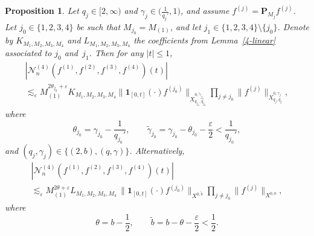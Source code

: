 \documentclass[11pt,reqno,english]{amsart}
\numberwithin{equation}{section}
\theoremstyle{plain}
\newtheorem{proposition}[theorem]{Proposition}
\theoremstyle{definition}
\theoremstyle{remark}
\begin{document}
\begin{proposition}\label{4linear'}
	Let $q_j\in[2,\infty)$ and $\gamma_j\in\big(\frac{1}{q_j'},1\big)$, and assume $f^{(j)}=\mathbf{P}_{M_j}f^{(j)}$. Let $j_0\in\{1,2,3,4\}$ be such that $M_{j_0}=M_{(1)}$, and let $j_1\in\{1,2,3,4\}\setminus\{j_0\}$. Denote by $K_{M_1,M_2,M_3,M_4}$ and $L_{M_1,M_2,M_3,M_4}$ the coefficients from Lemma~\ref{4-linear} associated to $j_0$ and~$j_1$. Then for any $|t|\leq 1$,
	\begin{multline}\label{quintic:type1}
		|\mathcal{N}_n^{(4)}(f^{(1)},f^{(2)},f^{(3)},f^{(4)})(t)|
		\\
		\lesssim_{\varepsilon}
		M_{(1)}^{2\theta_{j_0}+\varepsilon}
		K_{M_1,M_2,M_3,M_4}
		\|\mathbf{1}_{[0,t]}(\cdot)f^{(j_0)}\|_{X_{q_{j_0},q_{j_0}}^{0,\widetilde{\gamma}_{j_0}}}
		\prod_{j\neq j_0}\|f^{(j)}\|_{X_{q_j,q_j}^{0,\gamma_j}},
	\end{multline}
	where
	\[
	\theta_{j_0}=\gamma_{j_0}-\frac{1}{q_{j_0}'},
	\qquad
	\widetilde{\gamma}_{j_0}=\gamma_{j_0}-\theta_{j_0}-\frac{\varepsilon}{2}<\frac{1}{q_{j_0}'},
	\]
	and $(q_j,\gamma_j)\in\{(2,b),(q,\gamma)\}$. Alternatively,
	\begin{multline}\label{quintic:type2}
		|\mathcal{N}_n^{(4)}(f^{(1)},f^{(2)},f^{(3)},f^{(4)})(t)|
		\\
		\lesssim_{\varepsilon}
		M_{(1)}^{2\theta+\varepsilon}L_{M_1,M_2,M_3,M_4}\,\|\mathbf{1}_{[0,t]}(\cdot)f^{(j_0)}\|_{X^{0,\widetilde{b}}}
		\prod_{j\neq j_0}\|f^{(j)}\|_{X^{0,b}},
	\end{multline}
	where
	\[
	\theta=b-\frac{1}{2},
	\qquad
	\widetilde{b}=b-\theta-\frac{\varepsilon}{2}<\frac{1}{2}.
	\]
\end{proposition}
\end{document}
